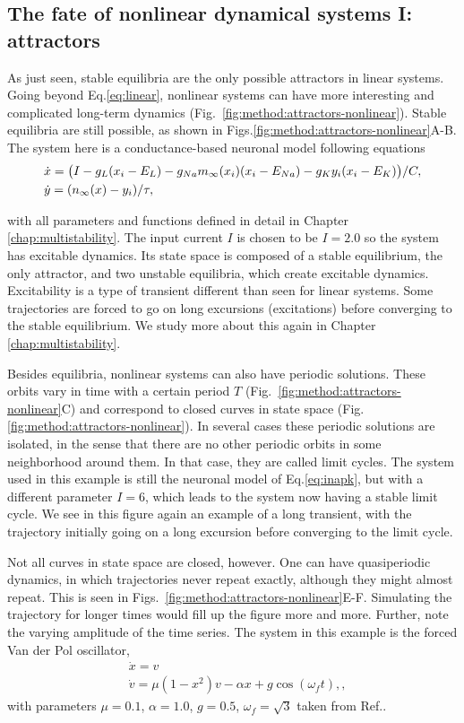 \subsection{The fate of nonlinear dynamical systems I: attractors}\label{method:nonlinear-I}
As just seen, stable equilibria are the only possible attractors in linear systems. Going beyond Eq.\ref{eq:linear}, nonlinear systems can have more interesting and complicated long-term dynamics (Fig.~\ref{fig:method:attractors-nonlinear}). Stable equilibria are still possible, as shown in Figs.\ref{fig:method:attractors-nonlinear}A-B. The system here is a conductance-based neuronal model following equations \cite{izhikevichbook}
%
\begin{align}
    &\dot{x} = \big(I - g_L (x_i - E_L)  
    - g_{Na} m_\infty(x_i) (x_i - E_{Na}) 
    -g_K y_i (x_i - E_K) \big)/C, \notag\\
    &\dot{y} = (n_\infty(x) - y_i) / \tau,
    \label{eq:inapk}
\end{align}

with all parameters and functions defined in detail in Chapter \ref{chap:multistability}. The input current $I$ is chosen to be $I=2.0$ so the system has excitable dynamics. Its state space is composed of a stable equilibrium, the only attractor, and two unstable equilibria, which create excitable dynamics. Excitability is a type of transient different than seen for linear systems. Some trajectories are forced to go on long excursions (excitations) before converging to the stable equilibrium. We study more about this again in Chapter \ref{chap:multistability}.

Besides equilibria, nonlinear systems can also have periodic solutions. These orbits vary in time with a certain period $T$ (Fig.~\ref{fig:method:attractors-nonlinear}C) and correspond to closed curves in state space (Fig.~ \ref{fig:method:attractors-nonlinear}). In several cases these periodic solutions are isolated, in the sense that there are no other periodic orbits in some neighborhood around them. In that case, they are called limit cycles.
The system used in this example is still the neuronal model of Eq.\ref{eq:inapk}, but with a different parameter $I=6$, which leads to the system now having a stable limit cycle. We see in this figure again an example of a long transient, with the trajectory initially going on a long excursion before converging to the limit cycle.

Not all curves in state space are closed, however. One can have quasiperiodic dynamics, in which trajectories never repeat exactly, although they might almost repeat. This is seen in Figs.~\ref{fig:method:attractors-nonlinear}E-F. Simulating the trajectory for longer times would fill up the figure more and more. Further, note the varying amplitude of the time series. The system in this example is the forced Van der Pol oscillator, 
%
\begin{align}
    &\dot{x} = v \\
    &\dot{v} = \mu (1-x^2)v - \alpha x + g \cos(\omega_f t),
    \label{eq:vanderpol},
\end{align}
with parameters $\mu=0.1$, $\alpha=1.0$, $g=0.5$, $\omega_f=\sqrt{3}$ taken from Ref.\cite{shukla2014a}.


